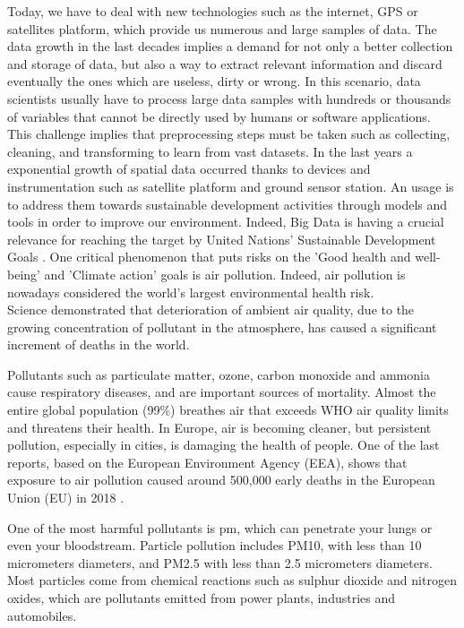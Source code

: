 Today, we have to deal with new technologies such as the internet, GPS or satellites platform, which provide us numerous and large samples of data. The data growth in the last decades implies a demand for not only a better collection and storage of data, but also a way to extract relevant information and discard eventually the ones which are useless, dirty or wrong.
In this scenario, data scientists usually have to process large data samples with hundreds or thousands of variables that \cite{garcia2016big} cannot be directly used by humans or software applications.
This challenge implies that preprocessing steps must be taken such as collecting, cleaning, and transforming to learn from vast datasets.
In the last years a exponential growth of spatial data occurred thanks to devices and instrumentation such as satellite platform and ground sensor station. 
An usage is to address them towards sustainable development activities through models and tools in order to improve our environment. Indeed, Big Data is having a crucial relevance for reaching the target by United Nations’ Sustainable Development Goals \cite{zhang2019orchestrating}.
One critical phenomenon that puts risks on the 'Good health and well-being' and 'Climate action' goals is air pollution.
Indeed, air pollution is nowadays considered the world's largest environmental health risk.\\
Science demonstrated that deterioration of ambient air quality, due to the growing concentration of pollutant in the atmosphere, has caused a significant increment of deaths in the world.\par  
Pollutants such as particulate matter, ozone, carbon monoxide and ammonia cause respiratory diseases, and are important sources of mortality.
Almost the entire global population (99\%) breathes air that exceeds WHO air quality limits and threatens their health.\newline
In Europe, air is becoming cleaner, but persistent pollution, especially in cities, is damaging the health of people. One of the last reports, based on the European Environment Agency (EEA), shows that exposure to air pollution caused around 500,000 early deaths in the European Union (EU) in 2018 \cite{european2018air}.\par
One of the most harmful pollutants is \gls{pm}, which can penetrate your lungs or even your bloodstream\newline. 
Particle pollution includes PM10, with less than 10 micrometers diameters, and PM2.5 with less than 2.5 micrometers diameters.
Most particles come from chemical reactions such as sulphur dioxide and nitrogen oxides, which are pollutants emitted from power plants, industries and automobiles.\par
